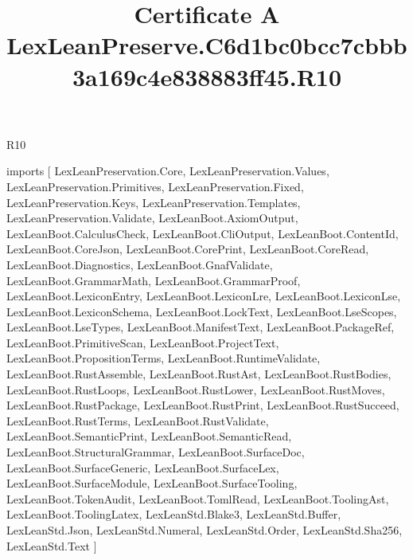\begin{lexlean}{R10}
\title{Certificate A LexLeanPreserve.C6d1bc0bcc7cbbb3a169c4e838883ff45.R10}
\begin{coremodule}
imports [
  LexLeanPreservation.Core,
  LexLeanPreservation.Values,
  LexLeanPreservation.Primitives,
  LexLeanPreservation.Fixed,
  LexLeanPreservation.Keys,
  LexLeanPreservation.Templates,
  LexLeanPreservation.Validate,
  LexLeanBoot.AxiomOutput,
  LexLeanBoot.CalculusCheck,
  LexLeanBoot.CliOutput,
  LexLeanBoot.ContentId,
  LexLeanBoot.CoreJson,
  LexLeanBoot.CorePrint,
  LexLeanBoot.CoreRead,
  LexLeanBoot.Diagnostics,
  LexLeanBoot.GnafValidate,
  LexLeanBoot.GrammarMath,
  LexLeanBoot.GrammarProof,
  LexLeanBoot.LexiconEntry,
  LexLeanBoot.LexiconLre,
  LexLeanBoot.LexiconLse,
  LexLeanBoot.LexiconSchema,
  LexLeanBoot.LockText,
  LexLeanBoot.LseScopes,
  LexLeanBoot.LseTypes,
  LexLeanBoot.ManifestText,
  LexLeanBoot.PackageRef,
  LexLeanBoot.PrimitiveScan,
  LexLeanBoot.ProjectText,
  LexLeanBoot.PropositionTerms,
  LexLeanBoot.RuntimeValidate,
  LexLeanBoot.RustAssemble,
  LexLeanBoot.RustAst,
  LexLeanBoot.RustBodies,
  LexLeanBoot.RustLoops,
  LexLeanBoot.RustLower,
  LexLeanBoot.RustMoves,
  LexLeanBoot.RustPackage,
  LexLeanBoot.RustPrint,
  LexLeanBoot.RustSucceed,
  LexLeanBoot.RustTerms,
  LexLeanBoot.RustValidate,
  LexLeanBoot.SemanticPrint,
  LexLeanBoot.SemanticRead,
  LexLeanBoot.StructuralGrammar,
  LexLeanBoot.SurfaceDoc,
  LexLeanBoot.SurfaceGeneric,
  LexLeanBoot.SurfaceLex,
  LexLeanBoot.SurfaceModule,
  LexLeanBoot.SurfaceTooling,
  LexLeanBoot.TokenAudit,
  LexLeanBoot.TomlRead,
  LexLeanBoot.ToolingAst,
  LexLeanBoot.ToolingLatex,
  LexLeanStd.Blake3,
  LexLeanStd.Buffer,
  LexLeanStd.Json,
  LexLeanStd.Numeral,
  LexLeanStd.Order,
  LexLeanStd.Sha256,
  LexLeanStd.Text
]


\end{coremodule}
\end{lexlean}

